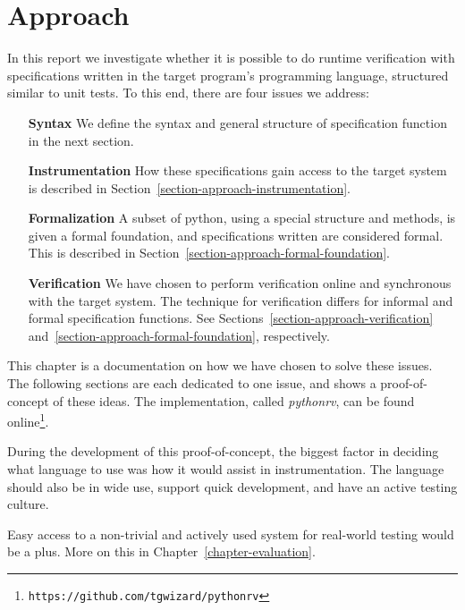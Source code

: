 
\pagestyle{newchap}
\chapter{Approach} \label{chapter-approach}
\lstset{language=Python}

In this report we investigate whether it is possible to do runtime verification
with specifications written in the target program's programming language,
structured similar to unit tests. To this end, there are four issues we
address:

\begin{itemize}
  \item[\textbf{Syntax}] We define the syntax and general structure of
    specification function in the next section.
  \item[\textbf{Instrumentation}] How these specifications gain access to the
    target system is described in
    Section~\ref{section-approach-instrumentation}.
  \item[\textbf{Formalization}] A subset of python, using a special structure
    and methods, is given a formal foundation, and specifications written are
    considered formal. This is described in
    Section~\ref{section-approach-formal-foundation}.
  \item[\textbf{Verification}] We have chosen to perform verification online
    and synchronous with the target system. The technique for verification
    differs for informal and formal specification functions.  See
    Sections~\ref{section-approach-verification}
    and~\ref{section-approach-formal-foundation}, respectively.
\end{itemize}

This chapter is a documentation on how we have chosen to solve these issues.
The following sections are each dedicated to one issue, and shows a
proof-of-concept of these ideas. The implementation, called \textit{pythonrv},
can be found online\footnote{\texttt{https://github.com/tgwizard/pythonrv}}.

During the development of this proof-of-concept, the biggest factor in deciding
what language to use was how it would assist in instrumentation. The language
should also be in wide use, support quick development, and have an active
testing culture.

Easy access to a non-trivial and actively used system for real-world testing
would be a plus. More on this in Chapter~\ref{chapter-evaluation}.

